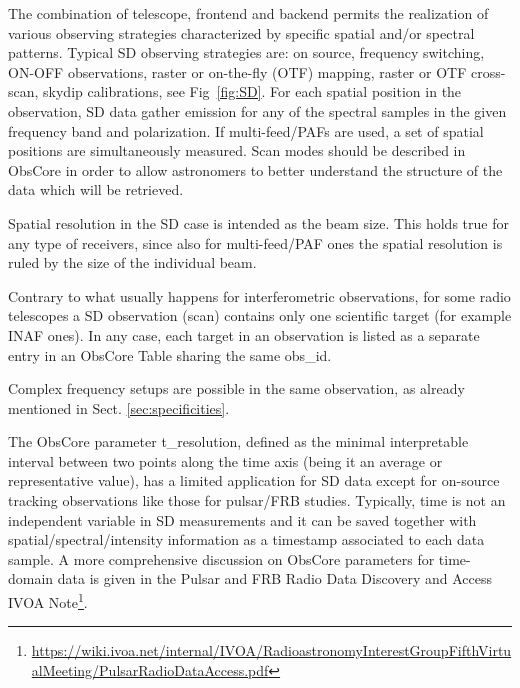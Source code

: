 \documentclass[11pt,a4paper]{ivoa}
\begin{document}
The combination of telescope, frontend and backend permits the realization of various observing strategies characterized by specific spatial and/or spectral patterns.
Typical SD observing strategies are: on source, frequency switching, ON-OFF observations, raster or on-the-fly (OTF) mapping, raster or OTF cross-scan, skydip calibrations, see Fig~\ref{fig:SD}. For each spatial position in the observation, SD data gather emission for any of the spectral samples in the given frequency band and polarization.  
If multi-feed/PAFs are used, a set of spatial positions are simultaneously measured. Scan modes should be described in ObsCore in order to allow astronomers to better understand the structure of the data which will be retrieved.

Spatial resolution in the SD case is intended as the beam size. This holds true for any type of receivers, since also for multi-feed/PAF ones the spatial resolution is ruled by the size of the individual beam. 

Contrary to what usually happens for  interferometric observations, for some radio telescopes a SD observation (scan) contains only one scientific target (for example INAF ones). In any case, each target in an observation is listed as a separate entry in an ObsCore Table sharing the same obs\_id.

Complex frequency setups are possible in the same observation, as already mentioned in Sect. \ref{sec:specificities}.

The ObsCore parameter t\_resolution, defined as the minimal interpretable interval between two points along the
time axis (being it an average or representative value), has a limited application for SD data except for on-source tracking
observations like those for pulsar/FRB studies.
Typically, time is not an independent variable in SD measurements and it can be saved together with spatial/spectral/intensity
information as a timestamp associated to each data sample.
A more comprehensive discussion on ObsCore parameters for time-domain data is given in the Pulsar
and FRB Radio Data Discovery and Access IVOA Note\footnote{\url{https://wiki.ivoa.net/internal/IVOA/RadioastronomyInterestGroupFifthVirtualMeeting/PulsarRadioDataAccess.pdf}}.
\end{document}
